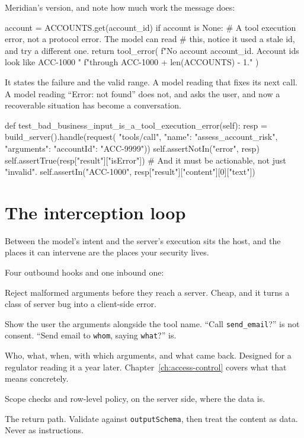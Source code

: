 Meridian's version, and note how much work the message does:

\begin{py}
account = ACCOUNTS.get(account_id)
if account is None:
    # A tool execution error, not a protocol error. The model can read
    # this, notice it used a stale id, and try a different one.
    return tool_error(
        f"No account {account_id}. Account ids look like ACC-1000 "
        f"through ACC-{1000 + len(ACCOUNTS) - 1}."
    )
\end{py}

It states the failure and the valid range. A model reading that fixes its next
call. A model reading ``Error: not found'' does not, and asks the user, and now
a recoverable situation has become a conversation.

\begin{py}
def test_bad_business_input_is_a_tool_execution_error(self):
    resp = build_server().handle(request(
        "tools/call",
        {"name": "assess_account_risk", "arguments": {"accountId": "ACC-9999"}}))
    self.assertNotIn("error", resp)
    self.assertTrue(resp["result"]["isError"])
    # And it must be actionable, not just "invalid".
    self.assertIn("ACC-1000", resp["result"]["content"][0]["text"])
\end{py}

\section{The interception loop}

Between the model's intent and the server's execution sits the host, and the
places it can intervene are the places your security lives.


Four outbound hooks and one inbound one:

\begin{description}[leftmargin=1.4em, style=nextline, itemsep=3pt]
\item[Schema validation] Reject malformed arguments before they reach a server.
Cheap, and it turns a class of server bug into a client-side error.
\item[Consent] Show the user the arguments alongside the tool name. ``Call
\texttt{send\_email}?'' is not consent. ``Send email to \texttt{whom}, saying
\texttt{what}?'' is.
\item[Audit] Who, what, when, with which arguments, and what came back. Designed for a regulator reading it a year later. Chapter~\ref{ch:access-control} covers
what that means concretely.
\item[Authorization] Scope checks and row-level policy, on the server side,
where the data is.
\item[Result validation] The return path. Validate against
\texttt{outputSchema}, then treat the content as data. Never as instructions.
\end{description}

